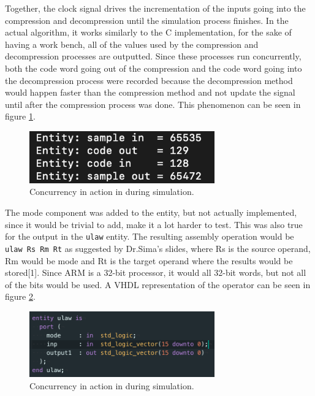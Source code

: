 \documentclass[12pt]{article}
\begin{document}
Together, the clock signal drives the incrementation of the inputs going into the compression and decompression until the simulation process finishes. In the actual algorithm, it works similarly to the C implementation, for the sake of having a work bench, all of the values used by the compression and decompression processes are outputted. Since these processes run concurrently, both the code word going out of the compression and the code word going into the decompression process were recorded because the decompression method would happen faster than the compression method and not update the signal until after the compression process was done. This phenomenon can be seen in figure \ref{fig:concur}.\\

\begin{figure}[!h]
		\centering
        \includegraphics[width=8cm]
        {concur.png}
        \caption{\label{fig:concur} Concurrency in action in during simulation.}
\end{figure}

The mode component was added to the entity, but not actually implemented, since it would be trivial to add, make it a lot harder to test. This was also true for the output in the \texttt{ulaw} entity. The resulting assembly operation would be \texttt{ulaw Rs Rm Rt} as suggested by Dr.Sima's slides, where Rs is the source operand, Rm would be mode and Rt is the target operand where the results would be stored[1]. Since ARM is a 32-bit processor, it would all 32-bit words, but not all of the bits would be used. A VHDL representation of the operator can be seen in figure \ref{fig:ulaw_entity}.\\



\begin{figure}[!h]
		\centering
        \includegraphics[width=8cm]
        {ulaw_entity.png}
        \caption{\label{fig:ulaw_entity} Concurrency in action in during simulation.}
\end{figure}
\end{document}
